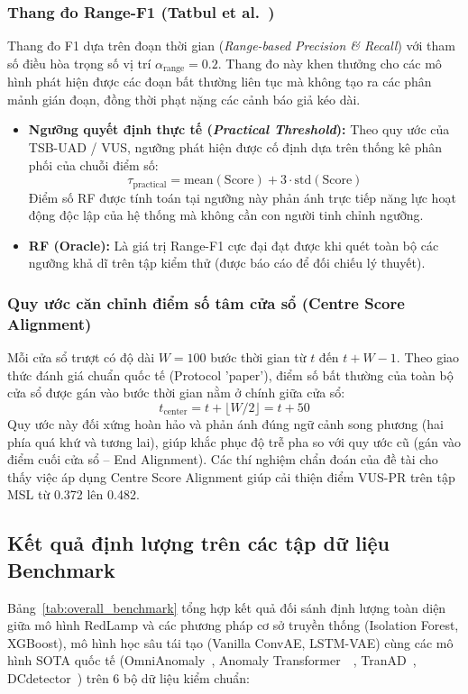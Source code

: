 \documentclass[11pt,journal,onecolumn]{IEEEtran}
\begin{document}
\subsubsection{Thang đo Range-F1 (Tatbul et al.~\cite{tatbul2018precision})}
Thang đo F1 dựa trên đoạn thời gian (\textit{Range-based Precision \& Recall}) với tham số điều hòa trọng số vị trí $\alpha_{\text{range}} = 0.2$. Thang đo này khen thưởng cho các mô hình phát hiện được các đoạn bất thường liên tục mà không tạo ra các phân mảnh gián đoạn, đồng thời phạt nặng các cảnh báo giả kéo dài.
\begin{itemize}
    \item \textbf{Ngưỡng quyết định thực tế (\textit{Practical Threshold}):} Theo quy ước của TSB-UAD / VUS, ngưỡng phát hiện được cố định dựa trên thống kê phân phối của chuỗi điểm số:
    \begin{equation}
    \tau_{\text{practical}} = \text{mean}(\text{Score}) + 3 \cdot \text{std}(\text{Score})
    \end{equation}
    Điểm số RF được tính toán tại ngưỡng này phản ánh trực tiếp năng lực hoạt động độc lập của hệ thống mà không cần con người tinh chỉnh ngưỡng.
    \item \textbf{RF (Oracle):} Là giá trị Range-F1 cực đại đạt được khi quét toàn bộ các ngưỡng khả dĩ trên tập kiểm thử (được báo cáo để đối chiếu lý thuyết).
\end{itemize}

\subsubsection{Quy ước căn chỉnh điểm số tâm cửa sổ (Centre Score Alignment)}
Mỗi cửa sổ trượt có độ dài $W = 100$ bước thời gian từ $t$ đến $t + W - 1$. Theo giao thức đánh giá chuẩn quốc tế (Protocol 'paper'), điểm số bất thường của toàn bộ cửa sổ được gán vào bước thời gian nằm ở chính giữa cửa sổ:
\begin{equation}
t_{\text{center}} = t + \lfloor W / 2 \rfloor = t + 50
\end{equation}
Quy ước này đối xứng hoàn hảo và phản ánh đúng ngữ cảnh song phương (hai phía quá khứ và tương lai), giúp khắc phục độ trễ pha so với quy ước cũ (gán vào điểm cuối cửa sổ -- End Alignment). Các thí nghiệm chẩn đoán của đề tài cho thấy việc áp dụng Centre Score Alignment giúp cải thiện điểm VUS-PR trên tập MSL từ 0.372 lên 0.482.

\subsection{Kết quả định lượng trên các tập dữ liệu Benchmark}
\label{subsec:quantitative_results}
Bảng~\ref{tab:overall_benchmark} tổng hợp kết quả đối sánh định lượng toàn diện giữa mô hình RedLamp và các phương pháp cơ sở truyền thống (Isolation Forest, XGBoost), mô hình học sâu tái tạo (Vanilla ConvAE, LSTM-VAE) cùng các mô hình SOTA quốc tế (OmniAnomaly~\cite{su2019robust}, Anomaly Transformer~\cite{xu2022anomaly}~\cite{xu2022anomaly}, TranAD~\cite{tuli2022tranad}, DCdetector~\cite{yang2023dcdetector}) trên 6 bộ dữ liệu kiểm chuẩn:
\end{document}
